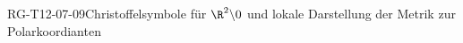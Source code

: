 
\begin{EXA}{RG-T12-07-09}{Christoffelsymbole für $\R^2\backslash 0$ und lokale Darstellung der Metrik zur Polarkoordianten}
\end{EXA}
